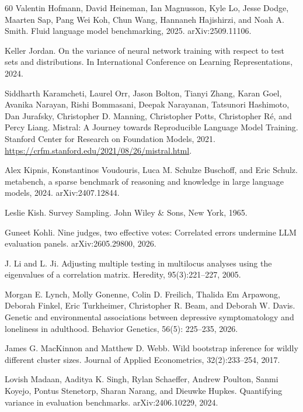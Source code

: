 \begin{thebibliography}{60}
Valentin Hofmann, David Heineman, Ian Magnusson, Kyle Lo, Jesse Dodge, Maarten Sap, Pang Wei Koh, Chun Wang, Hannaneh Hajishirzi, and Noah A. Smith. Fluid language model benchmarking, 2025. arXiv:2509.11106.

Keller Jordan. On the variance of neural network training with respect to test sets and distributions. In International Conference on Learning Representations, 2024.

Siddharth Karamcheti, Laurel Orr, Jason Bolton, Tianyi Zhang, Karan Goel, Avanika Narayan, Rishi Bommasani, Deepak Narayanan, Tatsunori Hashimoto, Dan Jurafsky, Christopher D. Manning, Christopher Potts, Christopher R\'{e}, and Percy Liang. Mistral: A Journey towards Reproducible Language Model Training. Stanford Center for Research on Foundation Models, 2021. \url{https://crfm.stanford.edu/2021/08/26/mistral.html}.

Alex Kipnis, Konstantinos Voudouris, Luca M. Schulze Buschoff, and Eric Schulz. metabench, a sparse benchmark of reasoning and knowledge in large language models, 2024. arXiv:2407.12844.

Leslie Kish. Survey Sampling. John Wiley \& Sons, New York, 1965.

Guneet Kohli. Nine judges, two effective votes: Correlated errors undermine LLM evaluation panels. arXiv:2605.29800, 2026.

J. Li and L. Ji. Adjusting multiple testing in multilocus analyses using the eigenvalues of a correlation matrix. Heredity, 95(3):221--227, 2005.

Morgan E. Lynch, Molly Gonenne, Colin D. Freilich, Thalida Em Arpawong, Deborah Finkel, Eric Turkheimer, Christopher R. Beam, and Deborah W. Davis. Genetic and environmental associations between depressive symptomatology and loneliness in adulthood. Behavior Genetics, 56(5): 225--235, 2026.

James G. MacKinnon and Matthew D. Webb. Wild bootstrap inference for wildly different cluster sizes. Journal of Applied Econometrics, 32(2):233--254, 2017.

Lovish Madaan, Aaditya K. Singh, Rylan Schaeffer, Andrew Poulton, Sanmi Koyejo, Pontus Stenetorp, Sharan Narang, and Dieuwke Hupkes. Quantifying variance in evaluation benchmarks. arXiv:2406.10229, 2024.


\end{thebibliography}

